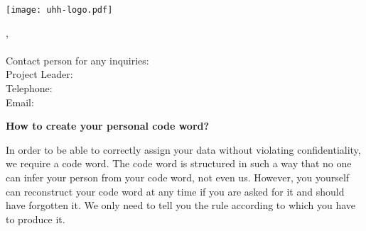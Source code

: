 \documentclass[11pt,twoside,a4paper]{article}
\begin{document}
\thispagestyle{fancy}

\begin{minipage}{0.5\linewidth}
    \texttt{[image: uhh-logo.pdf]}
\end{minipage}
\begin{minipage}{0.5\textwidth}\raggedleft{}
    \ApplicantUniversity{}, \ApplicantInstitute{}\\
    \ApplicantResearchGroup{}\\
    Contact person for any inquiries:\\
    Project Leader: \ProjectLeaderName{}\\
    Telephone: \InvestigatorPhoneNumber{}\\
    Email: \InvestigatorEmailAddress{}
\end{minipage}

\begin{flushleft}
    \Large\textbf{How to create your personal code word?}
\end{flushleft}

In order to be able to correctly assign your data without violating confidentiality, we require a code word.
The code word is structured in such a way that no one can infer your person from your code word, not even us.
However, you yourself can reconstruct your code word at any time if you are asked for it and should have forgotten it.
We only need to tell you the rule according to which you have to produce it.
\end{document}
